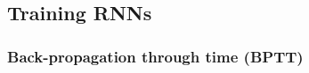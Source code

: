 \documentclass[11pt]{article}
\begin{document}
\begin{figure}[H]
    \centering
\end{figure}

\subsection{Training RNNs}

\subsubsection{Back-propagation through time (BPTT)}

\end{document}
